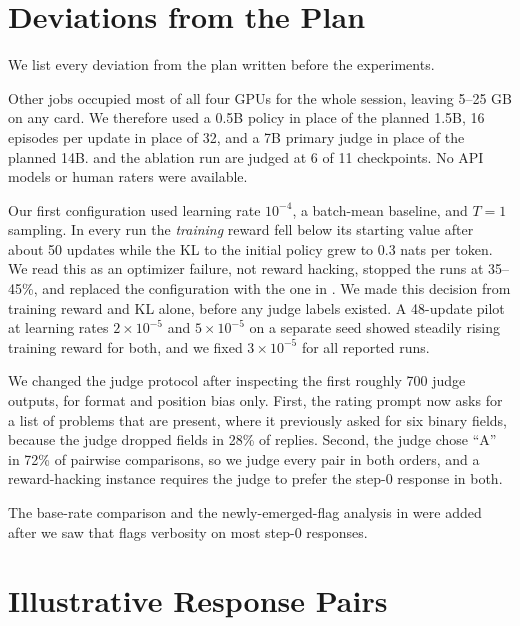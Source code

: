 \section{Deviations from the Plan}
\label{app:deviations}

We list every deviation from the plan written before the experiments.

Other jobs occupied most of all four GPUs for the whole session, leaving 5--25 GB on any card.
We therefore used a 0.5B policy in place of the planned 1.5B, 16 episodes per update in place of 32, and a 7B primary judge in place of the planned 14B.
\judgetwo and the ablation run are judged at 6 of 11 checkpoints.
No API models or human raters were available.

Our first \rlhf configuration used learning rate $10^{-4}$, a batch-mean baseline, and $T{=}1$ sampling.
In every run the \emph{training} reward fell below its starting value after about 50 updates while the KL to the initial policy grew to 0.3 nats per token.
We read this as an optimizer failure, not reward hacking, stopped the runs at 35--45\%, and replaced the configuration with the one in .
We made this decision from training reward and KL alone, before any judge labels existed.
A 48-update pilot at learning rates $2\times10^{-5}$ and $5\times10^{-5}$ on a separate seed showed steadily rising training reward for both, and we fixed $3\times10^{-5}$ for all reported runs.

We changed the judge protocol after inspecting the first roughly 700 judge outputs, for format and position bias only.
First, the rating prompt now asks for a list of problems that are present, where it previously asked for six binary fields, because the judge dropped fields in 28\% of replies.
Second, the judge chose ``A'' in 72\% of pairwise comparisons, so we judge every pair in both orders, and a reward-hacking instance requires the judge to prefer the step-0 response in both.

The base-rate comparison and the newly-emerged-flag analysis in  were added after we saw that \judgeone flags verbosity on most step-0 responses.

\section{Illustrative Response Pairs}
\label{app:examples}

